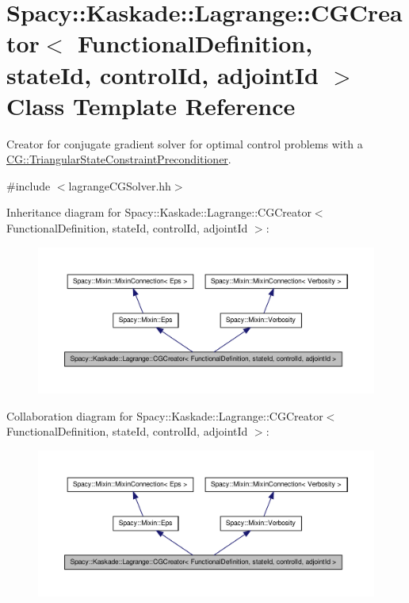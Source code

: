 \hypertarget{classSpacy_1_1Kaskade_1_1Lagrange_1_1CGCreator}{\section{\-Spacy\-:\-:\-Kaskade\-:\-:\-Lagrange\-:\-:\-C\-G\-Creator$<$ \-Functional\-Definition, state\-Id, control\-Id, adjoint\-Id $>$ \-Class \-Template \-Reference}
\label{classSpacy_1_1Kaskade_1_1Lagrange_1_1CGCreator}
}


\-Creator for conjugate gradient solver for optimal control problems with a \hyperlink{classSpacy_1_1CG_1_1TriangularStateConstraintPreconditioner}{\-C\-G\-::\-Triangular\-State\-Constraint\-Preconditioner}.  




{\ttfamily \#include $<$lagrange\-C\-G\-Solver.\-hh$>$}



\-Inheritance diagram for \-Spacy\-:\-:\-Kaskade\-:\-:\-Lagrange\-:\-:\-C\-G\-Creator$<$ \-Functional\-Definition, state\-Id, control\-Id, adjoint\-Id $>$\-:
\nopagebreak
\begin{figure}[H]
\begin{center}
\leavevmode
\includegraphics[width=350pt]{classSpacy_1_1Kaskade_1_1Lagrange_1_1CGCreator__inherit__graph}
\end{center}
\end{figure}


\-Collaboration diagram for \-Spacy\-:\-:\-Kaskade\-:\-:\-Lagrange\-:\-:\-C\-G\-Creator$<$ \-Functional\-Definition, state\-Id, control\-Id, adjoint\-Id $>$\-:
\nopagebreak
\begin{figure}[H]
\begin{center}
\leavevmode
\includegraphics[width=350pt]{classSpacy_1_1Kaskade_1_1Lagrange_1_1CGCreator__coll__graph}
\end{center}
\end{figure}
